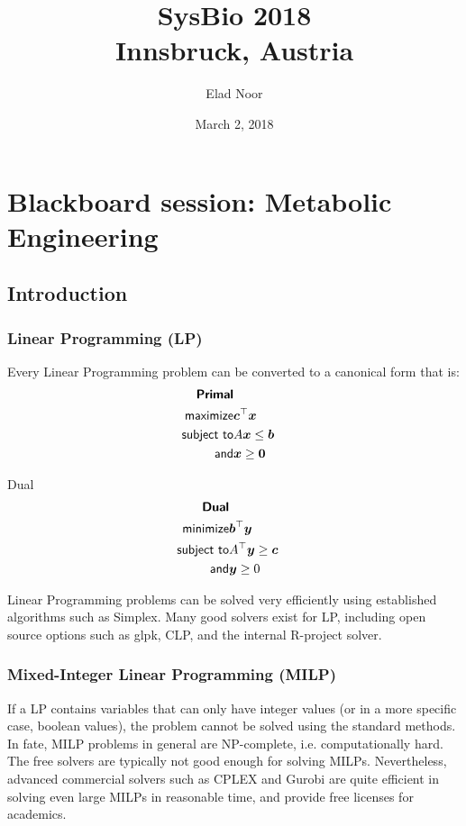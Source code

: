 \documentclass[10pt,a4paper]{article}
\date{March 2, 2018}
\title{\textbf{SysBio 2018}\\Innsbruck, Austria}
\author{Elad Noor}
\newcommand{\mymatrix}[1]{#1}
\newcommand{\myvector}[1]{{\boldsymbol{#1}}}
\begin{document}
\maketitle
\tableofcontents

\section{Blackboard session: Metabolic Engineering}

\subsection{Introduction}
\subsubsection{Linear Programming (LP)}
Every Linear Programming problem can be converted to a canonical form that is:
\begin{eqnarray}
	\textsf{\textbf{Primal}}&&\nonumber\\
	\textsf{maximize}&\myvector{c}^\top\myvector{x}&\nonumber\\
	\textsf{subject to}&\mymatrix{A}\myvector{x} \leq \myvector{b}&\nonumber\\
	\textsf{and}&\myvector{x}\geq \myvector{0}&
\end{eqnarray}

Dual
\begin{eqnarray}
	\textsf{\textbf{Dual}}&&\nonumber\\
	\textsf{minimize}&\myvector{b}^\top\myvector{y}&\nonumber\\
	\textsf{subject to}&\mymatrix{A}^\top\myvector{y} \geq \myvector{c}&\nonumber\\
	\textsf{and}&\myvector{y}\geq 0&
\end{eqnarray}

Linear Programming problems can be solved very efficiently using established algorithms such as Simplex. Many good solvers exist for LP, including open source options such as glpk, CLP, and the internal R-project solver.

\subsubsection{Mixed-Integer Linear Programming (MILP)}
If a LP contains variables that can only have integer values (or in a more specific case, boolean values), the problem cannot be solved using the standard methods. In fate, MILP problems in general are NP-complete, i.e. computationally hard. The free solvers are typically not good enough for solving MILPs. Nevertheless, advanced commercial solvers such as CPLEX and Gurobi are quite efficient in solving even large MILPs in reasonable time, and provide free licenses for academics.
\end{document}

